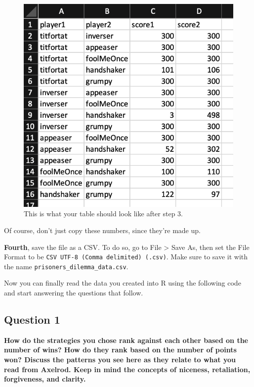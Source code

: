 \documentclass[
]{article}
\begin{document}
\begin{figure}
\centering
\includegraphics{./rmd_photos/step3.png}
\caption{This is what your table should look like after step 3.}
\end{figure}

Of course, don't just copy these numbers, since they're made up.

\textbf{Fourth}, save the file as a CSV. To do so, go to File
\textgreater{} Save As, then set the File Format to be
\texttt{CSV\ UTF-8\ (Comma\ delimited)\ (.csv)}. Make sure to save it
with the name \texttt{prisoners\_dilemma\_data.csv}.

Now you can finally read the data you created into R using the following
code and start answering the questions that follow.

\hypertarget{question-1}{%
\subsection{Question 1}\label{question-1}}

\textbf{How do the strategies you chose rank against each other based on
the number of wins? How do they rank based on the number of points won?
Discuss the patterns you see here as they relate to what you read from
Axelrod. Keep in mind the concepts of niceness, retaliation,
forgiveness, and clarity.}
\end{document}
